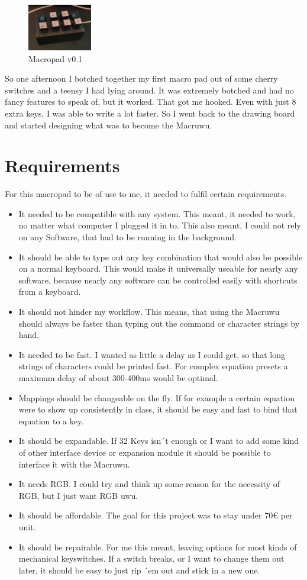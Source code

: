 \documentclass[english, 12pt]{scrartcl}
\begin{document}
	\begin{figure}
		\vspace{-0.8cm}
		\centering
		\includegraphics[width=0.25\textwidth]{Macropad 0-1}
		\caption{Macropad v0.1}
	\end{figure}
	\noindent So one afternoon I botched together my first macro pad out of some cherry switches and a teensy I had lying around. It was extremely botched and had no fancy features to speak of, but it worked. That got me hooked. Even with just 8 extra keys, I was able to write a lot faster. So I went back to the drawing board and started designing what was to become the Macruwu.
	\section{Requirements}
	For this macropad to be of use to me, it needed to fulfil certain requirements.
	\begin{itemize}
		\item It needed to be compatible with any system. This meant, it needed to work, no matter what computer I plugged it in to. This also meant, I could not rely on any Software, that had to be running in the background.
		\item It should be able to type out any key combination that would also be possible on a normal keyboard. This would make it universally useable for nearly any software, because nearly any software can be controlled easily with shortcuts from a keyboard.
		\item It should not hinder my workflow. This means, that using the Macruwu should always be faster than typing out the command or character strings by hand.
		\item It needed to be fast. I wanted as little a delay as I could get, so that long strings of characters could be printed fast. For complex equation presets a maximum delay of about 300-400ms would be optimal.
		\item Mappings should be changeable on the fly. If for example a certain equation were to show up consistently in class, it should be easy and fast to bind that equation to a key.
		\item It should be expandable. If 32 Keys isn´t enough or I want to add some kind of other interface device or expansion module it should be possible to interface it with the Macruwu.
		\item It needs RGB. I could try and think up some reason for the necessity of RGB, but I just want RGB uwu.
		\item It should be affordable. The goal for this project was to stay under 70€ per unit.
		\item It should be repairable. For me this meant, leaving options for most kinds of mechanical keyswitches. If a switch breaks, or I want to change them out later, it should be easy to just rip ´em out and stick in a new one.
	\end{itemize}
	\newpage
\end{document}
